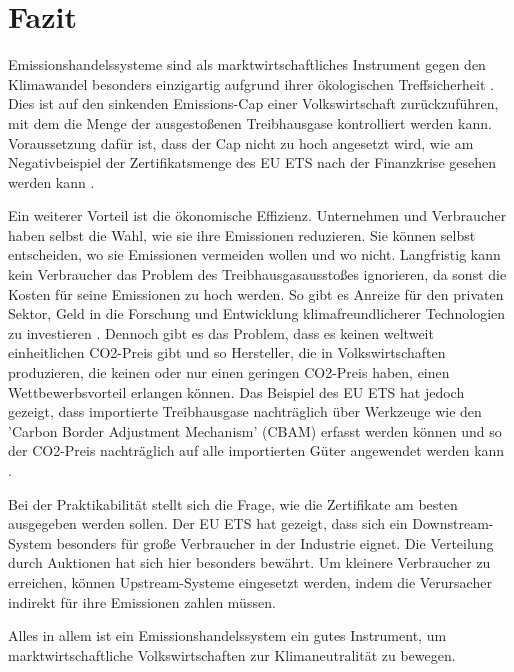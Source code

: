 \chapter{Fazit}

Emissionshandelssysteme sind als marktwirtschaftliches Instrument gegen den Klimawandel besonders einzigartig aufgrund ihrer ökologischen Treffsicherheit \cite[S. 182]{hubert.2020}.
Dies ist auf den sinkenden Emissions-Cap einer Volkswirtschaft zurückzuführen, mit dem die Menge der ausgestoßenen Treibhausgase kontrolliert werden kann.
Voraussetzung dafür ist, dass der Cap nicht zu hoch angesetzt wird, wie am Negativbeispiel der Zertifikatsmenge des EU ETS nach der Finanzkrise gesehen werden kann .

Ein weiterer Vorteil ist die ökonomische Effizienz. Unternehmen und Verbraucher haben selbst die Wahl, wie sie ihre Emissionen reduzieren.
Sie können selbst entscheiden, wo sie Emissionen vermeiden wollen und wo nicht. Langfristig kann kein Verbraucher das Problem des Treibhausgasausstoßes ignorieren, da sonst die Kosten für seine Emissionen zu hoch werden.
So gibt es Anreize für den privaten Sektor, Geld in die Forschung und Entwicklung klimafreundlicherer Technologien zu investieren \cite[S. 183]{hubert.2020}.
Dennoch gibt es das Problem, dass es keinen weltweit einheitlichen CO2-Preis gibt und so Hersteller, die in Volkswirtschaften produzieren, die keinen oder nur einen geringen CO2-Preis haben, einen Wettbewerbsvorteil erlangen können.
Das Beispiel des EU ETS hat jedoch gezeigt, dass importierte Treibhausgase nachträglich über Werkzeuge wie den 'Carbon Border Adjustment Mechanism' (CBAM) erfasst werden können und so der CO2-Preis nachträglich auf alle importierten Güter angewendet werden kann .

Bei der Praktikabilität stellt sich die Frage, wie die Zertifikate am besten ausgegeben werden sollen. Der EU ETS hat gezeigt, dass sich ein Downstream-System besonders für große Verbraucher in der Industrie eignet.
Die Verteilung durch Auktionen hat sich hier besonders bewährt. Um kleinere Verbraucher zu erreichen, können Upstream-Systeme eingesetzt werden, indem die Verursacher indirekt für ihre Emissionen zahlen müssen.

Alles in allem ist ein Emissionshandelssystem ein gutes Instrument, um marktwirtschaftliche Volkswirtschaften zur Klimaneutralität zu bewegen.